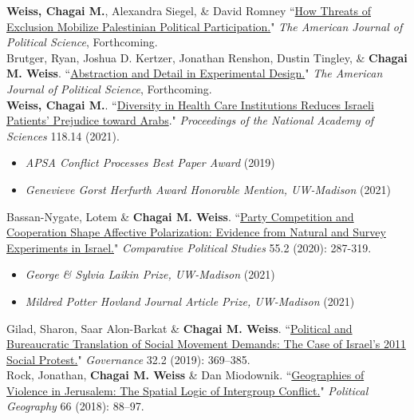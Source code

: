 \documentclass[11pt]{article}
\begin{document}
\textbf{Weiss, Chagai M.}, Alexandra Siegel, \& David Romney ``\href{https://onlinelibrary.wiley.com/doi/full/10.1111/ajps.12718}{How Threats of Exclusion Mobilize Palestinian Political Participation.}" \emph{The American Journal of Political Science}, Forthcoming.\\

Brutger, Ryan, Joshua D. Kertzer, Jonathan Renshon, Dustin Tingley, \& \textbf{Chagai M. Weiss}. ``\href{https://onlinelibrary.wiley.com/doi/full/10.1111/ajps.12710}{Abstraction and Detail in Experimental Design.}" \emph{The American Journal of Political Science}, Forthcoming.\\

 \textbf{Weiss, Chagai M.}. ``\href{https://www.pnas.org/content/118/14/e2022634118}{Diversity in Health Care Institutions Reduces Israeli Patients' Prejudice toward Arabs}." \emph{Proceedings of the National Academy of Sciences} 118.14 (2021).
 \begin{itemize}[label=$\star$]
 \item \emph{APSA Conflict Processes Best Paper Award} (2019)
 \item \emph{Genevieve Gorst Herfurth Award Honorable Mention, UW-Madison} (2021)
\end{itemize}
Bassan-Nygate, Lotem \& \textbf{Chagai M. Weiss}. ``\href{https://journals.sagepub.com/doi/full/10.1177/00104140211024283}{Party Competition and Cooperation Shape Affective Polarization: Evidence from Natural and Survey Experiments in Israel.}" \emph{Comparative Political Studies} 55.2 (2020): 287-319.
    \begin{itemize}[label=$\star$]
 \item \emph{George \& Sylvia Laikin Prize, UW-Madison} (2021)
  \item \emph{Mildred Potter Hovland Journal Article Prize, UW-Madison} (2021)
 \end{itemize}
 
 Gilad, Sharon, Saar Alon-Barkat \& \textbf{Chagai M. Weiss}. ``\href{https://onlinelibrary.wiley.com/doi/abs/10.1111/gove.12383}{Political and Bureaucratic Translation of Social Movement Demands: The Case of Israel's 2011 Social Protest.}" \textit{Governance} 32.2 (2019): 369--385.\\
 
 Rock, Jonathan, \textbf{Chagai M. Weiss} \& Dan Miodownik. ``\href{https://www.sciencedirect.com/science/article/pii/S0962629817303323}{Geographies of Violence in Jerusalem: The Spatial Logic of Intergroup Conflict.}" \textit{Political Geography} 66 (2018): 88--97.
\end{document}
